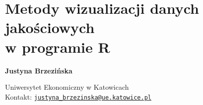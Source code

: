 \documentclass[\main/boa.tex]{subfiles}
\begin{document}
\section[Metody wizualizacji danych jakościowych w programie R]{Metody wizualizacji danych jakościowych \\ w programie R}


\begin{minipage}{0.915\textwidth}
	\centering
  {\bf \LARGE {} Justyna Brzezińska}
\end{minipage}


\begin{affiliations}
\begin{minipage}{0.915\textwidth}
\centering
\large Uniwersytet Ekonomiczny w Katowicach   \\[1pt]
Kontakt: \href{mailto:justyna_brzezinska@ue.katowice.pl}{\nolinkurl{justyna_brzezinska@ue.katowice.pl}}\\
\end{minipage}
\end{affiliations}
\end{document}
